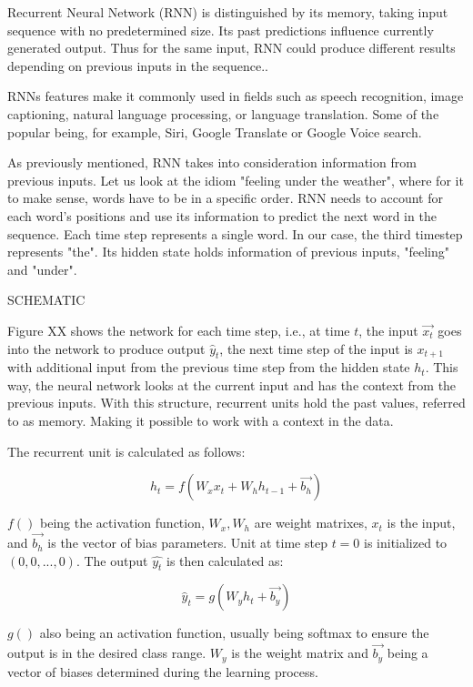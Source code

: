 Recurrent Neural Network (RNN) is distinguished by its memory, taking input sequence with no predetermined size. Its past predictions influence currently generated output. Thus for the same input, RNN could produce different results depending on previous inputs in the sequence.\cite{rnnDSmedium}.

RNNs features make it commonly used in fields such as speech recognition, image captioning, natural language processing, or language translation. Some of the popular being, for example, Siri, Google Translate or Google Voice search.\cite{ibmrnn}

As previously mentioned, RNN takes into consideration information from previous inputs. Let us look at the idiom "feeling under the weather", where for it to make sense, words have to be in a specific order. RNN needs to account for each word's positions and use its information to predict the next word in the sequence. Each time step represents a single word. In our case, the third timestep represents "the". Its hidden state holds information of previous inputs, "feeling" and "under".\cite{ibmrnn}

SCHEMATIC

Figure XX shows the network for each time step, i.e., at time $t$, the input $\vec{x_t}$ goes into the network to produce output $\hat{y}_t$, the next time step of the input is $x_{t+1}$ with additional input from the previous time step from the hidden state $h_{t}$. This way, the neural network looks at the current input and has the context from the previous inputs.
With this structure, recurrent units hold the past values, referred to as memory. Making it possible to work with a context in the data.
\cite{rnnin6}

The recurrent unit is calculated as follows:

\begin{equation}
    {h_t = f(W_{x}x_t + W_{h}h_{t-1}+\vec{b_h})}
\end{equation}

$f()$ being the activation function, $W_x,W_h$ are weight matrixes, $x_t$ is the input, and $\vec{b_h}$ is the vector of bias parameters. Unit at time step $t=0$ is initialized to $(0,0,...,0)$. The output $\hat{y_t}$ is then calculated as:

\begin{equation}
    {\hat{y}_t = g(W_{y}h_t + \vec{b_y})}
\end{equation}

$g()$ also being an activation function, usually being softmax to ensure the output is in the desired class range. $W_y$ is the weight matrix and $\vec{b_y}$ being a vector of biases determined during the learning process.

